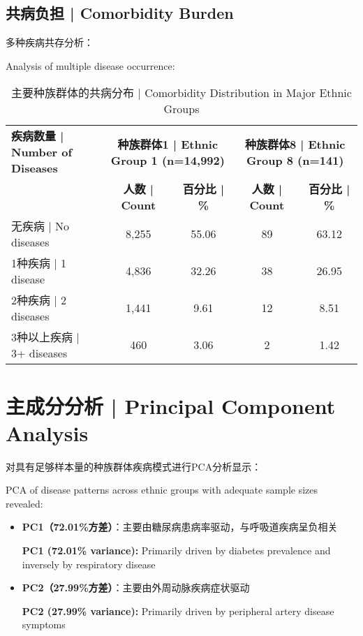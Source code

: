 \documentclass[12pt,a4paper]{article}
\begin{document}
\subsection{共病负担 | Comorbidity Burden}

多种疾病共存分析：

Analysis of multiple disease occurrence:

\begin{table}[H]
\centering
\caption{主要种族群体的共病分布 | Comorbidity Distribution in Major Ethnic Groups}
\begin{tabular}{@{}lcccc@{}}
\toprule
\textbf{疾病数量 | Number of Diseases} & \multicolumn{2}{c}{\textbf{种族群体1 | Ethnic Group 1 (n=14,992)}} & \multicolumn{2}{c}{\textbf{种族群体8 | Ethnic Group 8 (n=141)}} \\
\cmidrule(lr){2-3} \cmidrule(lr){4-5}
& \textbf{人数 | Count} & \textbf{百分比 | \%} & \textbf{人数 | Count} & \textbf{百分比 | \%} \\
\midrule
无疾病 | No diseases & 8,255 & 55.06 & 89 & 63.12 \\
1种疾病 | 1 disease & 4,836 & 32.26 & 38 & 26.95 \\
2种疾病 | 2 diseases & 1,441 & 9.61 & 12 & 8.51 \\
3种以上疾病 | 3+ diseases & 460 & 3.06 & 2 & 1.42 \\
\bottomrule
\end{tabular}
\end{table}

\section{主成分分析 | Principal Component Analysis}

对具有足够样本量的种族群体疾病模式进行PCA分析显示：

PCA of disease patterns across ethnic groups with adequate sample sizes revealed:

\begin{itemize}
    \item \textbf{PC1（72.01\%方差）}：主要由糖尿病患病率驱动，与呼吸道疾病呈负相关
    
    \textbf{PC1 (72.01\% variance):} Primarily driven by diabetes prevalence and inversely by respiratory disease
    
    \item \textbf{PC2（27.99\%方差）}：主要由外周动脉疾病症状驱动
    
    \textbf{PC2 (27.99\% variance):} Primarily driven by peripheral artery disease symptoms
\end{itemize}
\end{document}
